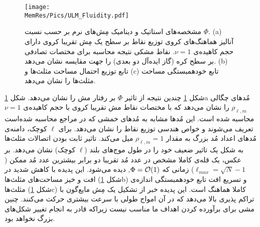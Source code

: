 \begin{figure}[ht]
\begin{center}
\texttt{[image: \\MemRes/Pics/ULM\_Fluidity.pdf]}
\caption{
مشخصه‌های استاتیک و دینامیک مِش‌های نرم بر حسب نسبت
$\Phi$. (a)
آنالیز هماهنگ‌های کروی توزیع نقاط بر سطح یک مِش تقریبا کروی دارای حجم کاهیده‌ی 
$\nu=1$.
 نقاط مشکی نتیجه محاسبه برای مختصات تصادفی بر سطح کره (گاز ایده‌آل دو بعدی) را جهت مقایسه نشان می‌دهد. 
(b)
تابع توزیع احتمال مساحت مثلث‌ها و 
(c)
تابع خودهمبستگی مساحت مثلث‌ها را نشان می‌دهد.
}
\label{fig:vertexULM}
\end{center}
\end{figure}

شکل
\ref{fig:vertexULM}
چندین نتیجه از تاثیر 
 $\Phi$
بر رفتار مش را نشان می‌دهد. شکل 
\ref{fig:vertexULM}a
 مُد‌های چگالی
$\rho_{\ell,m}$
را نشان می‌دهد که با مختصات نقاط مش تقریبا کروی با حجم کاهیده‌ی 
$\nu=1$
محاسبه‌ شده است. این مُد‌ها مشابه به مُد‌های خمشی که در مراجع 
\cite{safran1983, milnersafranPRA1987}
محاسبه شده‌است تعریف می‌شوند و خواص هندسی توزیع نقاط را نشان می‌دهد. برای 
$\ell$
کوچک، دامنه‌ی مُد‌های اعداد مُد بزرگ به مقدار
$\rho_{\ell,m}=1$
میل می‌کند. تاثیر ثابت بودن اتصالات مثلث‌ها به شکل یک تاثیر ضعیف خود را در طول‌ موج‌های بلند 
($\ell$
کوچک) نشان می‌دهد. بر عکس، یک قله‌ی کاملا مشخص در عدد مُد تقریبا دو برابر بیشترین عدد مُد ممکن 
($\ell_{max}=\sqrt{N}-1$)
 زمانی که 
$\Phi = {\cal O}(1)$,
دیده می‌شود. این پدیده با کاهش شدید در افت و خیز مساحت‌های مثلث‌ها  (شکل
\ref{fig:vertexULM}b)
و تسریع افت تابع خودهمبستگی اندازه‌ی مثلث‌ها (شکل
\ref{fig:vertexULM}c)
 کاملا هماهنگ است. این پدیده خبر از تشکیل یک مِش مایع‌گون با تراکم پذیری بالا می‌دهد که در آن امواج طولی با سرعت بیشتری حرکت می‌کنند. چنین مشی برای برآورده کردن اهداف ما مناسب نیست زیراکه قادر به انجام تغییر شکل‌های بزرگ نخواهد بود.












